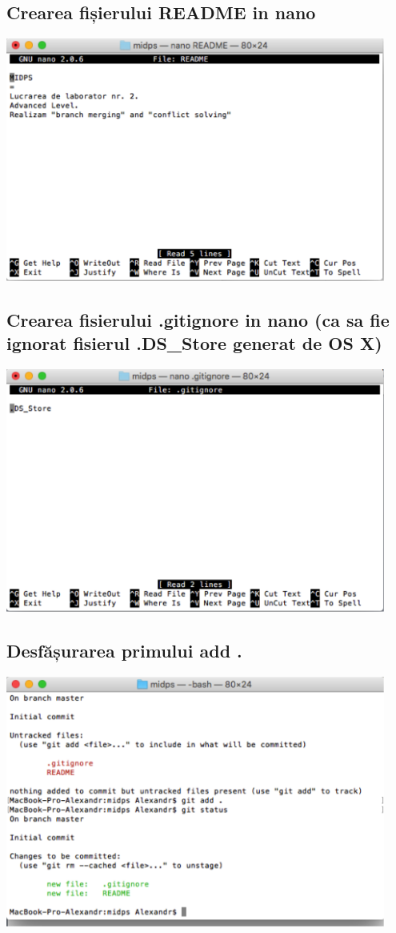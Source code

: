 \documentclass[12pt]{article}
\begin{document}
\subsection{Crearea fișierului README in nano}
\includegraphics[width=12.5cm]{images/7}
\subsection{Crearea fisierului .gitignore in nano (ca sa fie  ignorat fisierul .DS\_Store generat de OS X)}
\includegraphics[width=12.5cm]{images/8}
\subsection{Desfășurarea primului add .}
\includegraphics[width=12.5cm]{images/9}
\end{document}
